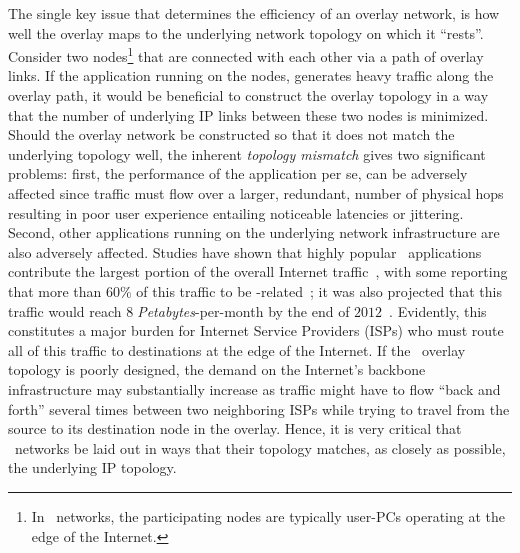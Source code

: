 The single key issue that determines the efficiency of an overlay network,
is how well the overlay maps to the underlying network topology on which it
``rests''. 
Consider two nodes\footnote{In \p\ networks,
the participating nodes are typically user-PCs operating at the edge of the
Internet.} that are connected with each other via a path of overlay links.
If the application running on the nodes, generates heavy traffic along
the overlay path, it would be beneficial to
construct the overlay topology in a way that the number of 
underlying IP links between these two nodes is minimized.
Should the overlay network be constructed so that
it does not match the underlying topology well, 
the inherent \emph{topology mismatch} gives two
significant problems: first, the performance of the application per se, can be
adversely affected since traffic must flow over a larger,
redundant, number of physical hops resulting in poor user experience 
entailing noticeable latencies or jittering. 
Second, other applications running
on the underlying network infrastructure are also adversely affected.
Studies have shown that highly popular \p\ applications contribute 
the largest portion of the overall 
Internet traffic~\cite{seroiu_analysiscds_2002,sen_analyzep2ptraffic_2004,krp_ispfear_2005}, with some reporting that more than $60$\% of this traffic 
to be \p-related~\cite{cachelogic,ipoque2007,ipoque2009};
it was also projected that this traffic would reach
$8\;$\emph{Petabytes}-per-month by the end of $2012$~\cite{multinteligence}. 
Evidently, this constitutes a major burden for 
Internet Service Providers (ISPs) who must route 
all of this traffic to destinations at the edge of the Internet. 
If the \p\ overlay topology is poorly designed, 
the demand on the Internet's backbone infrastructure may 
substantially increase as traffic might have to flow
``back and forth'' several times between two neighboring ISPs
while trying to travel from the source to its destination node
in the overlay.
Hence, it is very critical that \p\ networks be laid out 
in ways that their topology matches, as closely as possible, the 
underlying IP topology.

